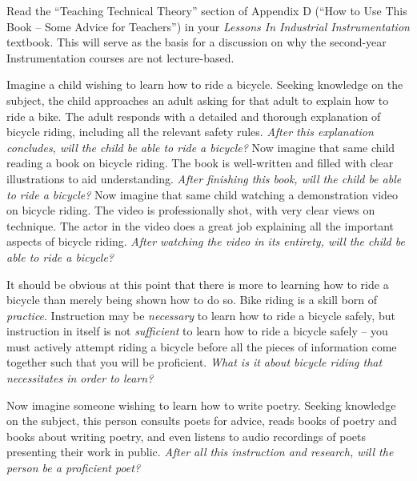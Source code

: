 

Read the ``Teaching Technical Theory'' section of Appendix D (``How to Use This Book -- Some Advice for Teachers'') in your {\it Lessons In Industrial Instrumentation} textbook.  This will serve as the basis for a discussion on why the second-year Instrumentation courses are not lecture-based.

\vskip 10pt

Imagine a child wishing to learn how to ride a bicycle.  Seeking knowledge on the subject, the child approaches an adult asking for that adult to explain how to ride a bike.  The adult responds with a detailed and thorough explanation of bicycle riding, including all the relevant safety rules.  {\it After this explanation concludes, will the child be able to ride a bicycle?}  Now imagine that same child reading a book on bicycle riding.  The book is well-written and filled with clear illustrations to aid understanding.  {\it After finishing this book, will the child be able to ride a bicycle?}  Now imagine that same child watching a demonstration video on bicycle riding.  The video is professionally shot, with very clear views on technique.  The actor in the video does a great job explaining all the important aspects of bicycle riding.  {\it After watching the video in its entirety, will the child be able to ride a bicycle?}

It should be obvious at this point that there is more to learning how to ride a bicycle than merely being shown how to do so.  Bike riding is a skill born of {\it practice}.  Instruction may be {\it necessary} to learn how to ride a bicycle safely, but instruction in itself is not {\it sufficient} to learn how to ride a bicycle safely -- you must actively attempt riding a bicycle before all the pieces of information come together such that you will be proficient.  {\it What is it about bicycle riding that necessitates  in order to learn?}

\vskip 10pt

Now imagine someone wishing to learn how to write poetry.  Seeking knowledge on the subject, this person consults poets for advice, reads books of poetry and books about writing poetry, and even listens to audio recordings of poets presenting their work in public.  {\it After all this instruction and research, will the person be a proficient poet?}

